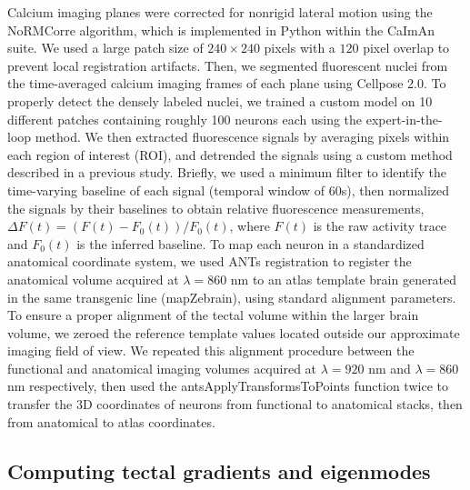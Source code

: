 \documentclass{article}
\begin{document}
Calcium imaging planes were corrected for nonrigid lateral motion using the NoRMCorre algorithm\cite{pnevmatikakis2017normcorre}, which is implemented in Python within the CaImAn suite\cite{giovannucci2019caiman}. We used a large patch size of $240\times240$ pixels with a $120$ pixel overlap to prevent local registration artifacts. Then, we segmented fluorescent nuclei from the time-averaged calcium imaging frames of each plane using Cellpose 2.0\cite{pachitariu2022cellpose}. To properly detect the densely labeled nuclei, we trained a custom model on 10 different patches containing roughly 100 neurons each using the expert-in-the-loop method. We then extracted fluorescence signals by averaging pixels within each region of interest (ROI), and detrended the signals using a custom method described in a previous study\cite{legare2024structural}. Briefly, we used a minimum filter to identify the time-varying baseline of each signal (temporal window of $60$s), then normalized the signals by their baselines to obtain relative fluorescence measurements, $\Delta F(t)=(F(t) - F_0(t))/F_0 (t)$, where $F(t)$ is the raw activity trace and $F_0(t)$ is the inferred baseline. To map each neuron in a standardized anatomical coordinate system, we used ANTs registration\cite{avants2009advanced} to register the anatomical volume acquired at $\lambda=860$ nm to an atlas template brain generated in the same transgenic line (mapZebrain\cite{kunst2019cellular}), using standard alignment parameters\cite{marquart2017high}. To ensure a proper alignment of the tectal volume within the larger brain volume, we zeroed the reference template values located outside our approximate imaging field of view. We repeated this alignment procedure between the functional and anatomical imaging volumes acquired at $\lambda=920$ nm and $\lambda=860$ nm respectively, then used the antsApplyTransformsToPoints function twice to transfer the 3D coordinates of neurons from functional to anatomical stacks, then from anatomical to atlas coordinates. 

\subsection*{Computing tectal gradients and eigenmodes}
\end{document}
